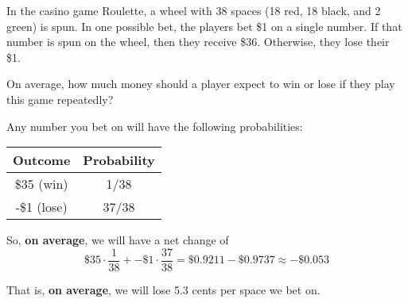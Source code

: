 \documentclass{beamer}
\begin{document}
\begin{frame}
\begin{example}
In the casino game Roulette, a wheel with 38 spaces (18 red, 18 black, and 2 green) is spun. In one possible bet, the players bet \$1 on a single number. If that number is spun on the wheel, then they receive \$36. Otherwise, they lose their \$1.

\vspace{2mm}
On average, how much money should a player expect to win or lose if they play this game repeatedly?\pause

\vspace{2mm}
Any number you bet on will have the following probabilities:
\begin{center}
\begin{tabular}{|c|c|} \hline
Outcome & Probability \\ \hline
\$35 (win) & 1/38 \\\hline
-\$1 (lose) & 37/38 \\ \hline
\end{tabular}
\end{center}\pause

So, \textbf{on average}, we will have a net change of
\begin{equation*}
\$35\cdot\dfrac{1}{38} + -\$1\cdot\dfrac{37}{38} = \$0.9211 - \$0.9737 \approx -\$0.053
\end{equation*}

That is, \textbf{on average}, we will lose 5.3 cents per space we bet on.
\end{example}
\end{frame}
\end{document}
